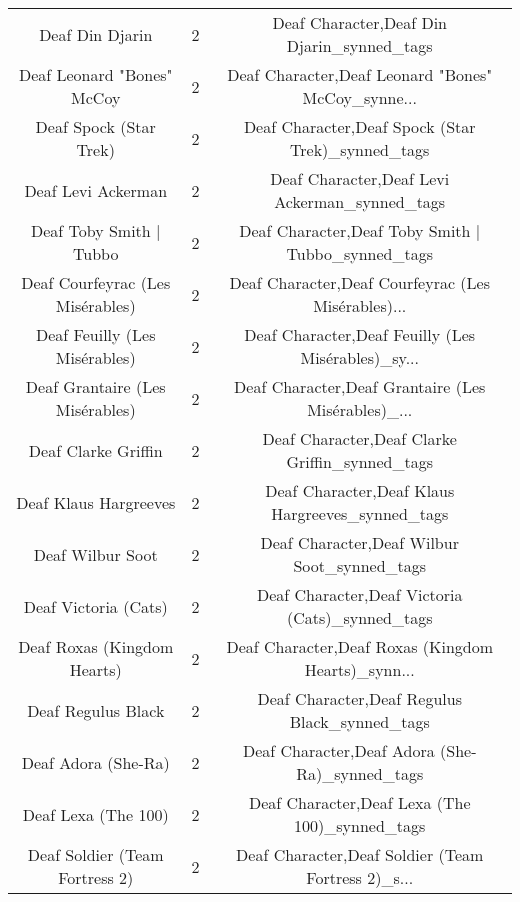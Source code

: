 \begin{table}[h!]
{\begin{tabular}{|c|c|c|}
                                   Deaf Din Djarin &          2 &         Deaf Character,Deaf Din Djarin\_synned\_tags \\
                        Deaf Leonard "Bones" McCoy &          2 & Deaf Character,Deaf Leonard "Bones" McCoy\_synne... \\
                            Deaf Spock (Star Trek) &          2 &  Deaf Character,Deaf Spock (Star Trek)\_synned\_tags \\
                                Deaf Levi Ackerman &          2 &      Deaf Character,Deaf Levi Ackerman\_synned\_tags \\
                           Deaf Toby Smith | Tubbo &          2 & Deaf Character,Deaf Toby Smith | Tubbo\_synned\_tags \\
                  Deaf Courfeyrac (Les Misérables) &          2 & Deaf Character,Deaf Courfeyrac (Les Misérables)... \\
                     Deaf Feuilly (Les Misérables) &          2 & Deaf Character,Deaf Feuilly (Les Misérables)\_sy... \\
                   Deaf Grantaire (Les Misérables) &          2 & Deaf Character,Deaf Grantaire (Les Misérables)\_... \\
                               Deaf Clarke Griffin &          2 &     Deaf Character,Deaf Clarke Griffin\_synned\_tags \\
                             Deaf Klaus Hargreeves &          2 &   Deaf Character,Deaf Klaus Hargreeves\_synned\_tags \\
                                  Deaf Wilbur Soot &          2 &        Deaf Character,Deaf Wilbur Soot\_synned\_tags \\
                              Deaf Victoria (Cats) &          2 &    Deaf Character,Deaf Victoria (Cats)\_synned\_tags \\
                       Deaf Roxas (Kingdom Hearts) &          2 & Deaf Character,Deaf Roxas (Kingdom Hearts)\_synn... \\
                                Deaf Regulus Black &          2 &      Deaf Character,Deaf Regulus Black\_synned\_tags \\
                               Deaf Adora (She-Ra) &          2 &     Deaf Character,Deaf Adora (She-Ra)\_synned\_tags \\
                               Deaf Lexa (The 100) &          2 &     Deaf Character,Deaf Lexa (The 100)\_synned\_tags \\
                    Deaf Soldier (Team Fortress 2) &          2 & Deaf Character,Deaf Soldier (Team Fortress 2)\_s... \\

\end{tabular}}
\end{table}
